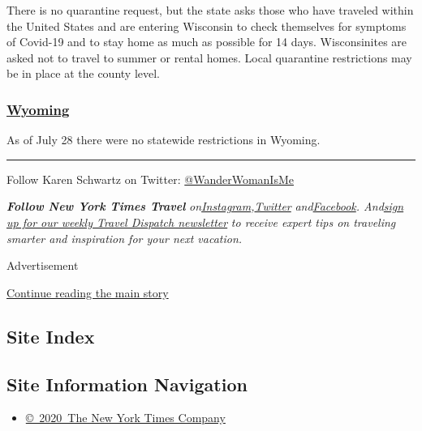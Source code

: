 There is no quarantine request, but the state asks those who have
traveled within the United States and are entering Wisconsin to check
themselves for symptoms of Covid-19 and to stay home as much as possible
for 14 days. Wisconsinites are asked not to travel to summer or rental
homes. Local quarantine restrictions may be in place at the county
level.

\hypertarget{wyoming}{%
\subsubsection{\texorpdfstring{\href{https://health.wyo.gov/publichealth/infectious-disease-epidemiology-unit/disease/novel-coronavirus/covid-19-orders-and-guidance/}{Wyoming}}{Wyoming}}\label{wyoming}}

As of July 28 there were no statewide restrictions in Wyoming.

\begin{center}\rule{0.5\linewidth}{\linethickness}\end{center}

Follow Karen Schwartz on Twitter:
\href{https://twitter.com/wanderwomanisme?lang=en}{@WanderWomanIsMe}

\emph{\textbf{Follow New York Times Travel}}
\emph{on}\href{https://www.instagram.com/nytimestravel/}{\emph{Instagram}}\emph{,}\href{https://twitter.com/nytimestravel}{\emph{Twitter}}
\emph{and}\href{https://www.facebook.com/nytimestravel/}{\emph{Facebook}}\emph{.
And}\href{https://www.nytimes.com/newsletters/traveldispatch}{\emph{sign
up for our weekly Travel Dispatch newsletter}} \emph{to receive expert
tips on traveling smarter and inspiration for your next vacation.}

Advertisement

\protect\hyperlink{after-bottom}{Continue reading the main story}

\hypertarget{site-index}{%
\subsection{Site Index}\label{site-index}}

\hypertarget{site-information-navigation}{%
\subsection{Site Information
Navigation}\label{site-information-navigation}}

\begin{itemize}
\tightlist
\item
  \href{https://help.nytimes.com/hc/en-us/articles/115014792127-Copyright-notice}{©~2020~The
  New York Times Company}
\end{itemize}

